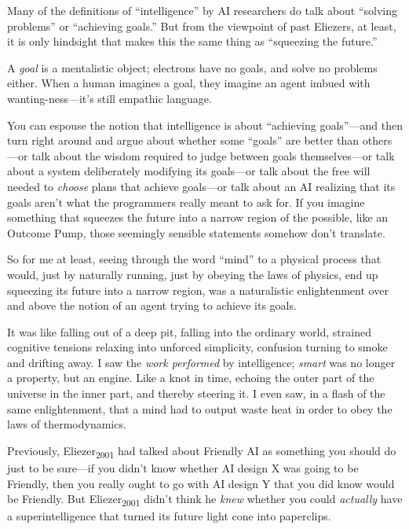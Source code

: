 {
 Many of the definitions of
``intelligence'' by AI researchers
do talk about ``solving problems''
or ``achieving goals.'' But from the
viewpoint of past Eliezers, at least, it is only hindsight that makes
this the same thing as ``squeezing the
future.''}

{
 A \textit{goal} is a mentalistic object; electrons have no goals,
and solve no problems either. When a human imagines a goal, they
imagine an agent imbued with wanting-ness---it's still
empathic language.}

{
 You can espouse the notion that intelligence is about
``achieving goals''---and then turn
right around and argue about whether some
``goals'' are better than
others---or talk about the wisdom required to judge between goals
themselves---or talk about a system deliberately modifying its
goals---or talk about the free will needed to \textit{choose} plans
that achieve goals---or talk about an AI realizing that its goals
aren't what the programmers really meant to ask for. If
you imagine something that squeezes the future into a narrow region of
the possible, like an Outcome Pump, those seemingly sensible statements
somehow don't translate.}

{
 So for me at least, seeing through the word
``mind'' to a physical process that
would, just by naturally running, just by obeying the laws of physics,
end up squeezing its future into a narrow region, was a naturalistic
enlightenment over and above the notion of an agent trying to achieve
its goals.}

{
 It was like falling out of a deep pit, falling into the ordinary
world, strained cognitive tensions relaxing into unforced simplicity,
confusion turning to smoke and drifting away. I saw the \textit{work
performed} by intelligence; \textit{smart} was no longer a property,
but an engine. Like a knot in time, echoing the outer part of the
universe in the inner part, and thereby steering it. I even saw, in a
flash of the same enlightenment, that a mind had to output waste heat
in order to obey the laws of thermodynamics.}

{
 Previously, Eliezer\textsubscript{2001} had talked about Friendly
AI as something you should do just to be sure---if you
didn't know whether AI design X was going to be
Friendly, then you really ought to go with AI design Y that you did
know would be Friendly. But Eliezer\textsubscript{2001}
didn't think he \textit{knew} whether you could
\textit{actually} have a superintelligence that turned its future light
cone into paperclips.}

